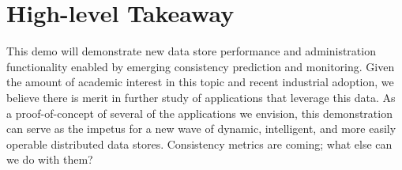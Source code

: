 
\section{High-level Takeaway}

This demo will demonstrate new data store performance and
administration functionality enabled by emerging consistency
prediction and monitoring. Given the amount of academic interest in
this topic and recent industrial adoption, we believe there is merit
in further study of applications that leverage this data. As a
proof-of-concept of several of the applications we envision, this
demonstration can serve as the impetus for a new wave of dynamic,
intelligent, and more easily operable distributed data stores. Consistency metrics
are coming; what else can we do with them?
